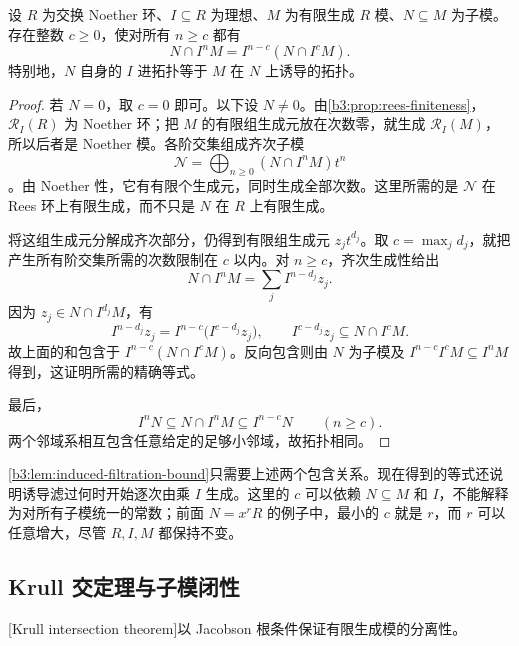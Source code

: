 \begin{theorem}\label{b3:thm:artin-rees}
	设 \(R\) 为交换 Noether 环、\(I\subseteq R\) 为理想、\(M\) 为有限生成 \(R\) 模、\(N\subseteq M\) 为子模。存在整数 \(c\ge0\)，使对所有 \(n\ge c\) 都有
	\[
		N\cap I^nM=I^{n-c}(N\cap I^cM).
	\]
	特别地，\(N\) 自身的 \(I\) 进拓扑等于 \(M\) 在 \(N\) 上诱导的拓扑。
\end{theorem}
\begin{proof}
	若 \(N=0\)，取 \(c=0\) 即可。以下设 \(N\ne0\)。由\cref{b3:prop:rees-finiteness}，\(\mathcal R_I(R)\) 为 Noether 环；把 \(M\) 的有限组生成元放在次数零，就生成 \(\mathcal R_I(M)\)，所以后者是 Noether 模。各阶交集组成齐次子模
	\[
		\mathcal N=\bigoplus_{n\ge0}(N\cap I^nM)t^n
	\]
	。由 Noether 性，它有有限个生成元，同时生成全部次数。这里所需的是 \(\mathcal N\) 在 Rees 环上有限生成，而不只是 \(N\) 在 \(R\) 上有限生成。

	将这组生成元分解成齐次部分，仍得到有限组生成元 \(z_jt^{d_j}\)。取 \(c=\max_jd_j\)，就把产生所有阶交集所需的次数限制在 \(c\) 以内。对 \(n\ge c\)，齐次生成性给出
	\[
		N\cap I^nM=\sum_jI^{n-d_j}z_j.
	\]
	因为 \(z_j\in N\cap I^{d_j}M\)，有
	\[
		I^{n-d_j}z_j=I^{n-c}\bigl(I^{c-d_j}z_j\bigr), \qquad I^{c-d_j}z_j\subseteq N\cap I^cM.
	\]
	故上面的和包含于 \(I^{n-c}(N\cap I^cM)\)。反向包含则由 \(N\) 为子模及 \(I^{n-c}I^cM\subseteq I^nM\) 得到，这证明所需的精确等式。

	最后，
	\[
		I^nN\subseteq N\cap I^nM\subseteq I^{n-c}N\qquad(n\ge c).
	\]
	两个邻域系相互包含任意给定的足够小邻域，故拓扑相同。
\end{proof}

\cref{b3:lem:induced-filtration-bound}只需要上述两个包含关系。现在得到的等式还说明诱导滤过何时开始逐次由乘 \(I\) 生成。这里的 \(c\) 可以依赖 \(N\subseteq M\) 和 \(I\)，不能解释为对所有子模统一的常数；前面 \(N=x^rR\) 的例子中，最小的 \(c\) 就是 \(r\)，而 \(r\) 可以任意增大，尽管 \(R,I,M\) 都保持不变。

\subsection{Krull 交定理与子模闭性}
\label{b3:subsec:1302:03}

[Krull intersection theorem]以 Jacobson 根条件保证有限生成模的分离性。

